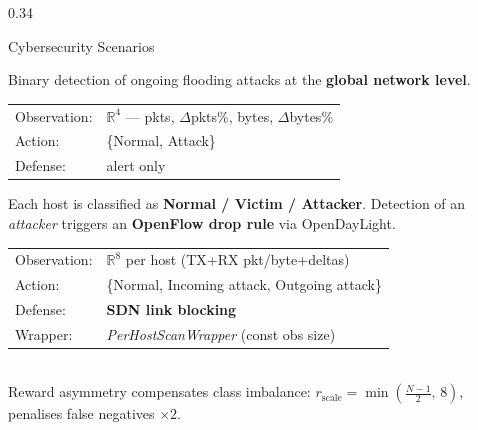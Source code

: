 \documentclass[final]{beamer}
\begin{document}
\begin{frame}[t]
\begin{columns}[T,totalwidth=\textwidth]
\begin{column}{0.34\textwidth}
\begin{block}{Cybersecurity Scenarios}
\vspace{0.5cm}

\begin{tcolorbox}[scenbox, title={Scenario 2 \textnormal{—} Network-Level Attack Detection}]
\large
Binary detection of ongoing flooding attacks at the
\textbf{global network level}.\\[5pt]
\begin{tabular}{@{}ll@{}}
Observation: & $\mathbb{R}^{4}$ — pkts, $\Delta$pkts\%, bytes, $\Delta$bytes\% \\
Action:      & \{Normal, Attack\} \\
Defense:     & alert only \\
\end{tabular}
\end{tcolorbox}

\vspace{0.5cm}

\begin{tcolorbox}[scenbox,
  title={Scenario 3 \textnormal{—} Per-Host Detection \textcolor{cyellow}{\normalfont(primary scenario)}}]
\large
Each host is classified as \textbf{Normal / Victim / Attacker}.
Detection of an \emph{attacker} triggers an
\textbf{\color{cred}OpenFlow drop rule} via OpenDayLight.\\[5pt]
\begin{tabular}{@{}ll@{}}
Observation: & $\mathbb{R}^{8}$ per host (TX+RX pkt/byte+deltas) \\
Action:      & \{Normal, Incoming attack, Outgoing attack\} \\
Defense:     & \textcolor{cred}{\textbf{SDN link blocking}} \\
Wrapper:     & \textit{PerHostScanWrapper} (const obs size) \\
\end{tabular}\\[5pt]
\small
Reward asymmetry compensates class imbalance:
$r_{\text{scale}} = \min\!\left(\frac{N-1}{2},\,8\right)$, penalises
false negatives $\times 2$.
\end{tcolorbox}

\vspace{0.5cm}


\end{block}
\end{column}
\end{columns}
\end{frame}
\end{document}
